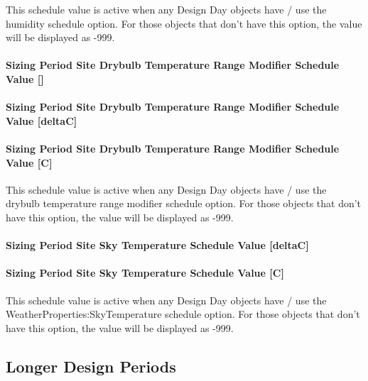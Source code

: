This schedule value is active when any Design Day objects have / use the humidity schedule option. For those objects that don't have this option, the value will be displayed as -999.

\paragraph{Sizing Period Site Drybulb Temperature Range Modifier Schedule Value {[]}}\label{sizing-period-site-drybulb-temperature-range-modifier-schedule-value}

\paragraph{Sizing Period Site Drybulb Temperature Range Modifier Schedule Value {[}deltaC{]}}\label{sizing-period-site-drybulb-temperature-range-modifier-schedule-value-deltac}

\paragraph{Sizing Period Site Drybulb Temperature Range Modifier Schedule Value {[}C{]}}\label{sizing-period-site-drybulb-temperature-range-modifier-schedule-value-c}

This schedule value is active when any Design Day objects have / use the drybulb temperature range modifier schedule option. For those objects that don't have this option, the value will be displayed as -999.

\paragraph{Sizing Period Site Sky Temperature Schedule Value {[}deltaC{]}}\label{sizing-period-site-sky-temperature-schedule-value-deltac}

\paragraph{Sizing Period Site Sky Temperature Schedule Value {[}C{]}}\label{sizing-period-site-sky-temperature-schedule-value-c}

This schedule value is active when any Design Day objects have / use the WeatherProperties:SkyTemperature schedule option. For those objects that don't have this option, the value will be displayed as -999.

\subsection{Longer Design Periods}\label{longer-design-periods}

